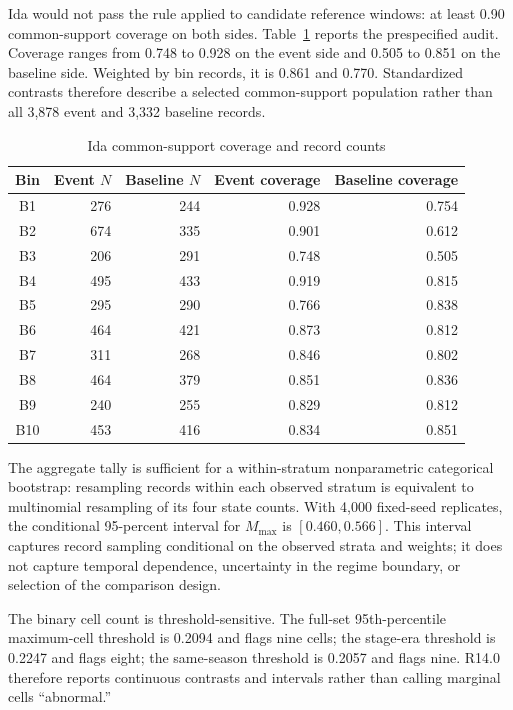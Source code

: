 \documentclass[11pt]{article}
\begin{document}
Ida would not pass the rule applied to candidate reference windows: at least 0.90 common-support coverage on both sides. Table~\ref{tab:coverage} reports the prespecified audit. Coverage ranges from 0.748 to 0.928 on the event side and 0.505 to 0.851 on the baseline side. Weighted by bin records, it is 0.861 and 0.770. Standardized contrasts therefore describe a selected common-support population rather than all 3,878 event and 3,332 baseline records.

\begin{table}[t]
\centering
\caption{Ida common-support coverage and record counts}
\label{tab:coverage}
\begin{tabular}{@{}crrrr@{}}
\toprule
Bin & Event $N$ & Baseline $N$ & Event coverage & Baseline coverage \\
\midrule
B1 & 276 & 244 & 0.928 & 0.754 \\
B2 & 674 & 335 & 0.901 & 0.612 \\
B3 & 206 & 291 & 0.748 & 0.505 \\
B4 & 495 & 433 & 0.919 & 0.815 \\
B5 & 295 & 290 & 0.766 & 0.838 \\
B6 & 464 & 421 & 0.873 & 0.812 \\
B7 & 311 & 268 & 0.846 & 0.802 \\
B8 & 464 & 379 & 0.851 & 0.836 \\
B9 & 240 & 255 & 0.829 & 0.812 \\
B10 & 453 & 416 & 0.834 & 0.851 \\
\bottomrule
\end{tabular}
\end{table}

The aggregate tally is sufficient for a within-stratum nonparametric categorical bootstrap: resampling records within each observed stratum is equivalent to multinomial resampling of its four state counts. With 4,000 fixed-seed replicates, the conditional 95-percent interval for $M_{\max}$ is $[0.460,0.566]$. This interval captures record sampling conditional on the observed strata and weights; it does not capture temporal dependence, uncertainty in the regime boundary, or selection of the comparison design.

The binary cell count is threshold-sensitive. The full-set 95th-percentile maximum-cell threshold is 0.2094 and flags nine cells; the stage-era threshold is 0.2247 and flags eight; the same-season threshold is 0.2057 and flags nine. R14.0 therefore reports continuous contrasts and intervals rather than calling marginal cells ``abnormal.''
\end{document}
